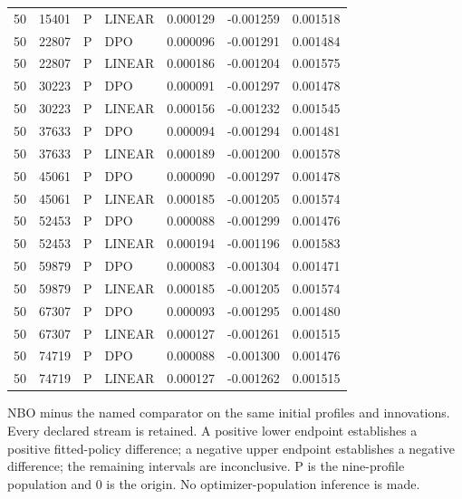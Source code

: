 \begin{longtable}{rrllrrr}
50 & 15401 & P & LINEAR & 0.000129 & -0.001259 & 0.001518\\
50 & 22807 & P & DPO & 0.000096 & -0.001291 & 0.001484\\
50 & 22807 & P & LINEAR & 0.000186 & -0.001204 & 0.001575\\
50 & 30223 & P & DPO & 0.000091 & -0.001297 & 0.001478\\
50 & 30223 & P & LINEAR & 0.000156 & -0.001232 & 0.001545\\
50 & 37633 & P & DPO & 0.000094 & -0.001294 & 0.001481\\
50 & 37633 & P & LINEAR & 0.000189 & -0.001200 & 0.001578\\
50 & 45061 & P & DPO & 0.000090 & -0.001297 & 0.001478\\
50 & 45061 & P & LINEAR & 0.000185 & -0.001205 & 0.001574\\
50 & 52453 & P & DPO & 0.000088 & -0.001299 & 0.001476\\
50 & 52453 & P & LINEAR & 0.000194 & -0.001196 & 0.001583\\
50 & 59879 & P & DPO & 0.000083 & -0.001304 & 0.001471\\
50 & 59879 & P & LINEAR & 0.000185 & -0.001205 & 0.001574\\
50 & 67307 & P & DPO & 0.000093 & -0.001295 & 0.001480\\
50 & 67307 & P & LINEAR & 0.000127 & -0.001261 & 0.001515\\
50 & 74719 & P & DPO & 0.000088 & -0.001300 & 0.001476\\
50 & 74719 & P & LINEAR & 0.000127 & -0.001262 & 0.001515\\
\bottomrule\end{longtable}
\noindent NBO minus the named comparator on the same initial profiles and innovations. Every declared stream is retained. A positive lower endpoint establishes a positive fitted-policy difference; a negative upper endpoint establishes a negative difference; the remaining intervals are inconclusive. P is the nine-profile population and 0 is the origin. No optimizer-population inference is made.
\endgroup
